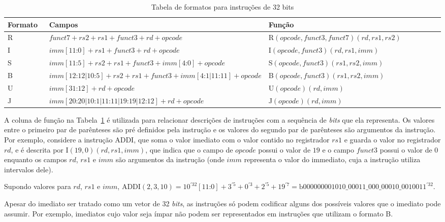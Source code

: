   \begin{table}
    \begin{tabular}{ |p{0.1\linewidth}|p{0.45\linewidth}|p{0.45\linewidth}| } 
      \hline
      Formato & Campos & Função \\ \hline \hline
      R & $funct7+rs2+rs1+funct3+rd+opcode$ & R$(opcode, funct3, funct7)(rd, rs1, rs2)$ \\ \hline
      I & $imm[11\text{:}0]+rs1+funct3+rd+opcode$ & I$(opcode, funct3)(rd, rs1, imm)$ \\ \hline
      S & $imm[11\text{:}5]+rs2+rs1+funct3+imm[4\text{:}0]+opcode$ & S$(opcode, funct3)(rs1, rs2, imm)$ \\ \hline
      B & $imm[12\text{:}12|10\text{:}5]+rs2+rs1+funct3+imm[4\text{:}1|11\text{:}11]+opcode$ & B$(opcode, funct3)(rs1, rs2, imm)$ \\ \hline
      U & $imm[31\text{:}12]+rd+opcode$ & U$(opcode)(rd, imm)$ \\ \hline
      J & $imm[20\text{:}20|10\text{:}1|11\text{:}11|19\text{:}19|12\text{:}12]+rd+opcode$ & J$(opcode)(rd, imm)$ \\ \hline 
    \end{tabular}
  \caption{Tabela de formatos para instruções de 32 bits\label{tab:if32f}}
  \end{table}

  A coluna de função na Tabela~\ref{tab:if32f} é utilizada para relacionar descrições de instruções com a 
  sequência de \emph{bits} que ela representa. Os valores entre o primeiro par de parênteses são pré definidos 
  pela instrução e os valores do segundo par de parênteses são argumentos da instrução. Por exemplo, considere 
  a instrução ADDI, que soma o valor imediato com o valor contido no registrador $rs1$ e guarda o valor no 
  registrador $rd$, e é descrita por I$(19,0)(rd, rs1, imm)$, que indica que o campo de $opcode$ possui o 
  valor de $19$ e o campo $funct3$ possui o valor de $0$ enquanto os campos $rd$, $rs1$ e $imm$ são argumentos 
  da instrução (onde $imm$ representa o valor do immediato, cuja a instrução utiliza intervalos dele).

  Supondo valores para $rd$, $rs1$ e $imm$, $\text{ADDI}(2, 3, 10) = 
  10^{'32}[11\text{:}0] + 3^{'5} + 0^{'3} + 2^{'5} + 19^{'7} = \text{b}000000001010\_00011\_000\_00010\_0010011^{'32}$.

  Apesar do imediato ser tratado como um vetor de 32 \emph{bits}, as instruções só podem codificar 
  alguns dos possíveis valores que o imediato pode assumir. Por exemplo, imediatos cujo valor seja ímpar não 
  podem ser representados em instruções que utilizam o formato B.

